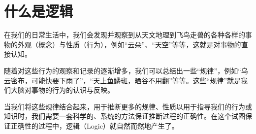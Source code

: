 \section{什么是逻辑}\label{sec:Logic/WhatIsLogic}
    在我们的日常生活中，我们会发现并观察到从天文地理到飞鸟走兽的各种各样的事物的外观（概念）与性质（行为），例如“云朵”、“天空”等等，这就是对事物的直接认知。

    随着对这些行为的观察和记录的逐渐增多，我们可以总结出一些“规律”，例如“乌云密布，可能快要下雨了”，“天上鱼鳞斑，晒谷不用翻”等等。这些“规律”就是我们大脑对事物的行为的认识与反映。

    当我们将这些规律结合起来，用于推断更多的规律、性质以用于指导我们的行为或知识时，我们需要一套科学的、系统的方法保证推断过程的正确性。在这个试图保证正确性的过程中，逻辑（Logic）就自然而然地产生了。
